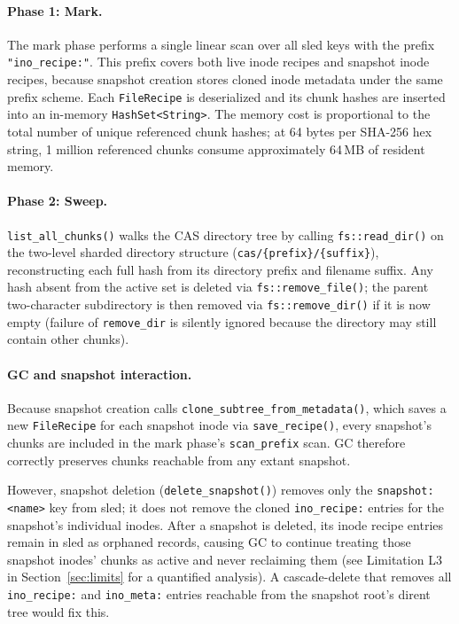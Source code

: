 \documentclass[5p,times]{elsarticle}
\begin{document}
\paragraph{Phase 1: Mark.}
The mark phase performs a single linear scan over all sled keys with the
prefix \texttt{"ino\_recipe:"}.  This prefix covers both live inode
recipes and snapshot inode recipes, because snapshot creation stores
cloned inode metadata under the same prefix scheme.  Each
\texttt{FileRecipe} is deserialized and its chunk hashes are inserted
into an in-memory \texttt{HashSet\textless{}String\textgreater{}}.  The
memory cost is proportional to the total number of unique referenced
chunk hashes; at 64 bytes per SHA-256 hex string, 1 million referenced
chunks consume approximately 64\,MB of resident memory.

\paragraph{Phase 2: Sweep.}
\texttt{list\_all\_chunks()} walks the CAS directory tree by calling
\texttt{fs::read\_dir()} on the two-level sharded directory structure
(\texttt{cas/\{prefix\}/\{suffix\}}), reconstructing each full hash
from its directory prefix and filename suffix.  Any hash absent from
the active set is deleted via \texttt{fs::remove\_file()}; the parent
two-character subdirectory is then removed via \texttt{fs::remove\_dir()}
if it is now empty (failure of \texttt{remove\_dir} is silently ignored
because the directory may still contain other chunks).

\paragraph{GC and snapshot interaction.}
Because snapshot creation calls \texttt{clone\_subtree\_from\_metadata()},
which saves a new \texttt{FileRecipe} for each snapshot inode via
\texttt{save\_recipe()}, every snapshot's chunks are included in the
mark phase's \texttt{scan\_prefix} scan.  GC therefore correctly
preserves chunks reachable from any extant snapshot.

However, snapshot deletion (\texttt{delete\_snapshot()}) removes only
the \texttt{snapshot:\textless{}name\textgreater{}} key from sled; it
does not remove the cloned \texttt{ino\_recipe:} entries for the
snapshot's individual inodes.  After a snapshot is deleted, its inode
recipe entries remain in sled as orphaned records, causing GC to continue
treating those snapshot inodes' chunks as active and never reclaiming them
(see Limitation L3 in Section~\ref{sec:limits} for a quantified analysis).
A cascade-delete that removes all \texttt{ino\_recipe:} and
\texttt{ino\_meta:} entries reachable from the snapshot root's dirent tree
would fix this.
\end{document}
